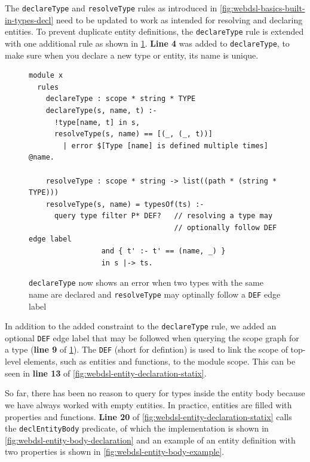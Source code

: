       The \texttt{declareType} and \texttt{resolveType} rules as introduced in \cref{fig:webdsl-basics-built-in-types-decl} need to be updated to work as intended for resolving and declaring entities. To prevent duplicate entity definitions, the \texttt{declareType} rule is extended with one additional rule as shown in \cref{fig:webdsl-entity-new-type-declare-and-resolve}. \textbf{Line 4} was added to \texttt{declareType}, to make sure when you declare a new type or entity, its name is unique.

      \begin{figure}
        \begin{verbatim}
module x
  rules
    declareType : scope * string * TYPE
    declareType(s, name, t) :-
      !type[name, t] in s,
      resolveType(s, name) == [(_, (_, t))]
        | error $[Type [name] is defined multiple times] @name.

    resolveType : scope * string -> list((path * (string * TYPE)))
    resolveType(s, name) = typesOf(ts) :-
      query type filter P* DEF?   // resolving a type may
                                  // optionally follow DEF edge label
                 and { t' :- t' == (name, _) }
                 in s |-> ts.
        \end{verbatim}
        \caption{\label{fig:webdsl-entity-new-type-declare-and-resolve}\texttt{declareType} now shows an error when two types with the same name are declared and \texttt{resolveType} may optinally follow a \texttt{DEF} edge label}
      \end{figure}

      In addition to the added constraint to the \texttt{declareType} rule, we added an optional \texttt{DEF} edge label that may be followed when querying the scope graph for a type (\textbf{{line 9}} of \cref{fig:webdsl-entity-new-type-declare-and-resolve}). The \texttt{DEF} (short for defintion) is used to link the scope of top-level elements, such as entities and functions, to the module scope. This can be seen in \textbf{line 13} of \cref{fig:webdsl-entity-declaration-statix}.

      So far, there has been no reason to query for types inside the entity body because we have always worked with empty entities. In practice, entities are filled with properties and functions. \textbf{Line 20} of \cref{fig:webdsl-entity-declaration-statix} calls the \texttt{declEntityBody} predicate, of which the implementation is shown in \cref{fig:webdsl-entity-body-declaration} and an example of an entity definition with two properties is shown in \cref{fig:webdsl-entity-body-example}.
      
